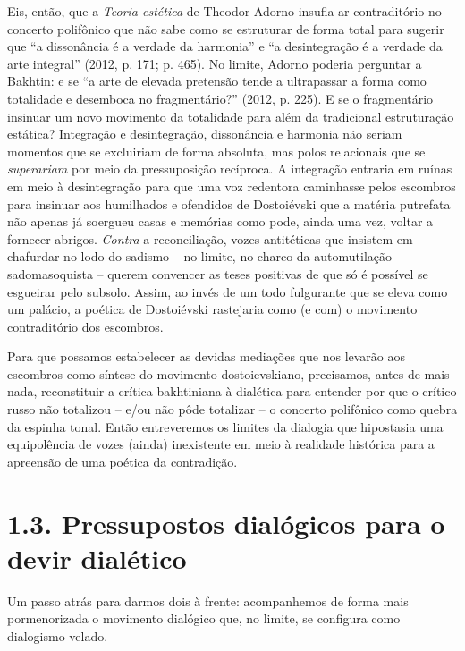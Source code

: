 Eis, então, que a \emph{Teoria estética} de Theodor Adorno insufla ar
contraditório no concerto polifônico que não sabe como se estruturar de
forma total para sugerir que ``a dissonância é a verdade da harmonia'' e
``a desintegração é a verdade da arte integral'' (2012, p. 171; p. 465).
No limite, Adorno poderia perguntar a Bakhtin: e se ``a arte de elevada
pretensão tende a ultrapassar a forma como totalidade e desemboca no
fragmentário?'' (2012, p. 225). E se o fragmentário insinuar um novo
movimento da totalidade para além da tradicional estruturação estática?
Integração e desintegração, dissonância e harmonia não seriam momentos
que se excluiriam de forma absoluta, mas polos relacionais que se
\emph{superariam} por meio da pressuposição recíproca. A integração
entraria em ruínas em meio à desintegração para que uma voz redentora
caminhasse pelos escombros para insinuar aos humilhados e ofendidos de
Dostoiévski que a matéria putrefata não apenas já soergueu casas e
memórias como pode, ainda uma vez, voltar a fornecer abrigos.
\emph{Contra} a reconciliação, vozes antitéticas que insistem em
chafurdar no lodo do sadismo -- no limite, no charco da automutilação
sadomasoquista -- querem convencer as teses positivas de que só é
possível se esgueirar pelo subsolo. Assim, ao invés de um todo
fulgurante que se eleva como um palácio, a poética de Dostoiévski
rastejaria como (e com) o movimento contraditório dos escombros.

Para que possamos estabelecer as devidas mediações que nos levarão aos
escombros como síntese do movimento dostoievskiano, precisamos, antes de
mais nada, reconstituir a crítica bakhtiniana à dialética para entender
por que o crítico russo não totalizou -- e/ou não pôde totalizar -- o
concerto polifônico como quebra da espinha tonal. Então entreveremos os
limites da dialogia que hipostasia uma equipolência de vozes (ainda)
inexistente em meio à realidade histórica para a apreensão de uma
poética da contradição.

\section{1.3. Pressupostos dialógicos para o devir dialético}

Um passo atrás para darmos dois à frente: acompanhemos de forma mais
pormenorizada o movimento dialógico que, no limite, se configura como
dialogismo velado.

